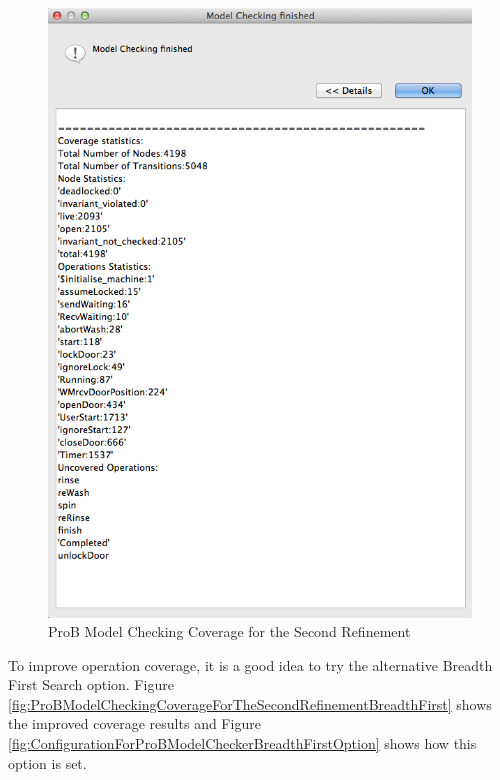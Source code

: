 \begin{figure}[!htbp]
  \includegraphics[width=1\textwidth]{figures/image33.png}
  \fi
  \caption{ProB Model Checking Coverage for the Second Refinement }
  \label{fig:ProBModelCheckingCoverageForTheSecondRefinement}
\end{figure} 
 
To improve operation coverage, it is a good idea to try the alternative Breadth First Search option. Figure \ref{fig:ProBModelCheckingCoverageForTheSecondRefinementBreadthFirst} shows the improved coverage results and Figure \ref{fig:ConfigurationForProBModelCheckerBreadthFirstOption} shows how this option is set.
 
